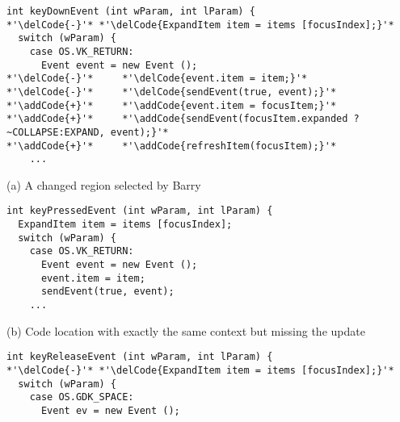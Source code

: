 \begin{figure*}[!t]
\begin{lstlisting}[style=MyJavaSmallStyle]
int keyDownEvent (int wParam, int lParam) {
*'\delCode{-}'* *'\delCode{ExpandItem item = items [focusIndex];}'*
  switch (wParam) {
    case OS.VK_RETURN:
      Event event = new Event ();
*'\delCode{-}'*     *'\delCode{event.item = item;}'*
*'\delCode{-}'*     *'\delCode{sendEvent(true, event);}'*
*'\addCode{+}'*     *'\addCode{event.item = focusItem;}'*
*'\addCode{+}'*     *'\addCode{sendEvent(focusItem.expanded ?~COLLAPSE:EXPAND, event);}'*
*'\addCode{+}'*     *'\addCode{refreshItem(focusItem);}'*
    ...
\end{lstlisting}
\vspace{-0.4cm}
\begin{center}\begin{scriptsize}(a) A changed region selected by {\sf Barry}\end{scriptsize}\end{center}
\vspace{-0.4cm}
%
\begin{lstlisting}[style=MyJavaSmallStyle]
int keyPressedEvent (int wParam, int lParam) {
  ExpandItem item = items [focusIndex];
  switch (wParam) {
    case OS.VK_RETURN:
      Event event = new Event ();
      event.item = item;
      sendEvent(true, event);
    ...
\end{lstlisting}
\vspace{-0.7cm}
\begin{center}\begin{scriptsize}(b) Code location with exactly the same context but missing the update\end{scriptsize}\end{center}
\vspace{-0.4cm}
%
\begin{lstlisting}[style=MyJavaSmallStyle]
int keyReleaseEvent (int wParam, int lParam) {
*'\delCode{-}'* *'\delCode{ExpandItem item = items [focusIndex];}'*
  switch (wParam) {
    case OS.GDK_SPACE:
      Event ev = new Event ();

\end{lstlisting}
\end{figure*}
